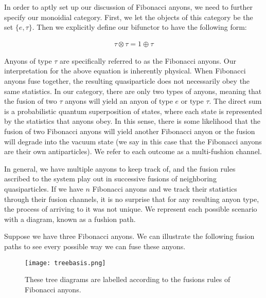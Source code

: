 In order to aptly set up our discussion of Fibonacci anyons, we need to further specify our monoidial category. First, we let the objects of this category be the set $\{e,\tau\}$. Then we explicitly define our bifunctor to have the following form:

\begin{equation}
	\begin{aligned}
		\tau \otimes \tau = 1\oplus \tau
	\end{aligned}
\end{equation}

Anyons of type $\tau$ are specifically referred to as the Fibonacci anyons. Our interpretation for the above equation is inherently physical. When Fibonacci anyons fuse together, the resulting quasiparticle does not necessarily obey the same statistics. In our category, there are only two types of anyons, meaning that the fusion of two $\tau$ anyons will yield an anyon of type $e$ or type $\tau$. The direct sum is a probabilistic quantum superposition of states, where each state is represented by the statistics that anyons obey. In this sense, there is some likelihood that the fusion of two Fibonacci anyons will yield another Fibonacci anyon or the fusion will degrade into the vacuum state (we say in this case that the Fibonacci anyons are their own antiparticles). We refer to each outcome as a multi-fushion channel.

In general, we have multiple anyons to keep track of, and the fusion rules ascribed to the system play out in successive fusions of neighboring quasiparticles. If we have $n$ Fibonacci anyons and we track their statistics through their fusion channels, it is no surprise that for any resulting anyon type, the process of arriving to it was not unique. We represent each possible scenario with a diagram, known as a fushion path.

\begin{example}\end{example} 
Suppose we have three Fibonacci anyons. We can illustrate the following fusion paths to see every possible way we can fuse these anyons.

\begin{figure}[H]
	\centering
	\texttt{[image: treebasis.png]}
	\caption{These tree diagrams are labelled according to the fusions rules of Fibonacci anyons.}
\end{figure}


